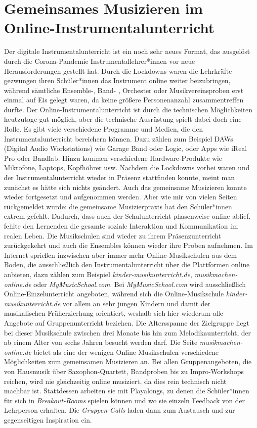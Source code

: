 \section{Gemeinsames Musizieren im Online-Instrumentalunterricht}

Der digitale Instrumentalunterricht ist ein noch sehr neues Format, das
ausgelöst durch die Corona-Pandemie Instrumentallehrer*innen
vor neue Herausforderungen gestellt hat. Durch die Lockdowns waren die
Lehrkräfte gezwungen ihren Schüler*innen das Instrument online weiter
beizubringen, während sämtliche Ensemble-, Band- , Orchester oder
Musikvereinsproben erst einmal auf Eis gelegt waren, da keine größere
Personenanzahl zusammentreffen durfte. Der Online-Instrumentalunterricht ist
durch die technischen Möglichkeiten heutzutage gut möglich, aber die technische
Ausrüstung spielt dabei doch eine Rolle. Es gibt viele verschiedene Programme
und Medien, die den Instrumentalunterricht bereichern können. Dazu zählen zum
Beispiel DAWs (Digital Audio Workstations) wie Garage Band oder Logic, oder Apps
wie iReal Pro oder Bandlab. Hinzu kommen verschiedene
Hardware-Produkte wie Mikrofone, Laptops, Kopfhöhrer usw. Nachdem
die Lockdowns vorbei waren und der Instrumentalunterricht wieder in
Präsenz stattfinden konnte, meint man zunächst es hätte sich nichts geändert.
Auch das gemeinsame Musizieren konnte wieder fortgesetzt und aufgenommen werden.
Aber wie mir von vielen Seiten rückgemeldet wurde: die gemeinsame Musizierpraxis
hat den Schüler*innen extrem gefehlt. Dadurch, dass auch der Schulunterricht
phasenweise online ablief, fehlte den Lernenden die gesamte soziale Interaktion
und Kommunikation im realen Leben. Die Musikschulen sind wieder zu ihrem
Präsenzunterricht zurückgekehrt und auch die Ensembles können wieder ihre Proben
aufnehmen. Im Internet sprießen inzwischen aber immer mehr Online-Musikschulen
aus dem Boden, die ausschließlich den Instrumentalunterricht über die
Plattformen online anbieten, dazu zählen zum Beispiel
\emph{kinder-musikunterricht.de}, \emph{musikmachen-online.de} oder
\emph{MyMusicSchool.com}. Bei \emph{MyMusicSchool.com} wird ausschließlich
Online-Einzelunterricht angeboten, während sich die Online-Musikschule
\emph{kinder-musikunterricht.de} vor allem an sehr jungen Kindern und damit der
musikalischen Früherzierhung orientiert, weshalb sich hier wiederum alle
Angebote auf Gruppenunterricht beziehen. Die Altersspanne der Zielgruppe liegt
bei dieser Musikschule zwischen drei Monate bis hin zum Melodikaunterricht, der
ab einem Alter von sechs Jahren besucht werden darf.
\autocite{online_musikschule_emp} Die Seite \emph{musikmachen-online.de} bietet
als eine der wenigen Online-Musikschulen verschiedene Möglichkeiten zum
gemeinsamen Musizieren an. \autocite{online_musikschule_mmo} Bei allen
Gruppenangeboten, die von Hausmusik über Saxophon-Quartett, Bandproben bis zu
Impro-Workshops reichen, wird nie gleichzeitig online musiziert, da dies rein
technisch nicht machbar ist. Stattdessen arbeiten sie mit Playalongs, zu denen
die Schüler*innen für sich in \emph{Breakout-Rooms} spielen können und wo sie
einzeln Feedback von der Lehrperson erhalten. Die \emph{Gruppen-Calls} laden
dann zum Austausch und zur gegenseitigen Inspiration ein.
\autocite{online_musikschule_mmo}



